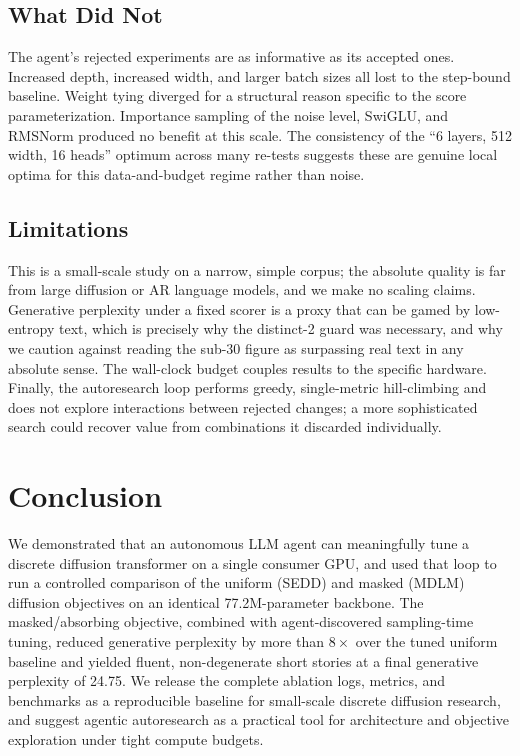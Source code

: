 \documentclass[conference]{IEEEtran}
\begin{document}
\subsection{What Did Not}
The agent's rejected experiments are as informative as its accepted
ones. Increased depth, increased width, and larger batch sizes all lost
to the step-bound baseline. Weight tying diverged for a structural
reason specific to the score parameterization. Importance sampling of
the noise level, SwiGLU, and RMSNorm produced no benefit at this scale.
The consistency of the ``6 layers, 512 width, 16 heads'' optimum across
many re-tests suggests these are genuine local optima for this
data-and-budget regime rather than noise.

\subsection{Limitations}
This is a small-scale study on a narrow, simple corpus; the absolute
quality is far from large diffusion or AR language models, and we make
no scaling claims. Generative perplexity under a fixed scorer is a proxy
that can be gamed by low-entropy text, which is precisely why the
distinct-2 guard was necessary, and why we caution against reading the
sub-30 figure as surpassing real text in any absolute sense. The
wall-clock budget couples results to the specific hardware. Finally, the
autoresearch loop performs greedy, single-metric hill-climbing and does
not explore interactions between rejected changes; a more sophisticated
search could recover value from combinations it discarded individually.

\section{Conclusion}
We demonstrated that an autonomous LLM agent can meaningfully tune a
discrete diffusion transformer on a single consumer GPU, and used that
loop to run a controlled comparison of the uniform (SEDD) and masked
(MDLM) diffusion objectives on an identical 77.2M-parameter backbone.
The masked/absorbing objective, combined with agent-discovered
sampling-time tuning, reduced generative perplexity by more than
$8\times$ over the tuned uniform baseline and yielded fluent,
non-degenerate short stories at a final generative perplexity of 24.75.
We release the complete ablation logs, metrics, and benchmarks as a
reproducible baseline for small-scale discrete diffusion research, and
suggest agentic autoresearch as a practical tool for architecture and
objective exploration under tight compute budgets.
\end{document}
